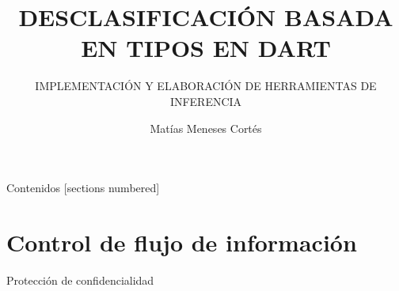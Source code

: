 \documentclass[aspectratio=169,10pt]{beamer}
\title{DESCLASIFICACIÓN BASADA EN TIPOS EN DART}
\subtitle{IMPLEMENTACIÓN Y ELABORACIÓN DE HERRAMIENTAS DE INFERENCIA}
\date{}
\author{Matías Meneses Cortés}
\begin{document}
\maketitle

\begin{frame}{Contenidos}
  [sections numbered]
  \tableofcontents[hideallsubsections]
\end{frame}

\section{Control de flujo de información}

\begin{frame}[fragile]{Protección de confidencialidad}
  \begin{center}
  \end{center}
\end{frame}
\end{document}
